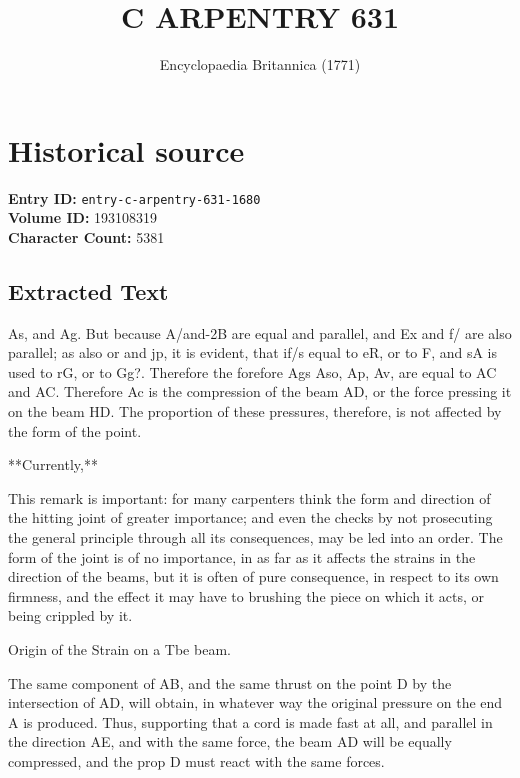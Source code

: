 \documentclass{article}
\title{C ARPENTRY 631}
\date{Encyclopaedia Britannica (1771)}
\begin{document}
\maketitle

\section*{Historical source}
\textbf{Entry ID:} \texttt{entry-c-arpentry-631-1680} \\
\textbf{Volume ID:} 193108319 \\
\textbf{Character Count:} 5381

\subsection*{Extracted Text}
As, and Ag. But because A/and-2B are equal and parallel, and Ex and f/ are also parallel; as also or and jp, it is evident, that if/s equal to eR, or to F, and sA is used to rG, or to Gg?. Therefore the forefore Ags Aso, Ap, Av, are equal to AC and AC. Therefore Ac is the compression of the beam AD, or the force pressing it on the beam HD. The proportion of these pressures, therefore, is not affected by the form of the point.

**Currently,**

This remark is important: for many carpenters think the form and direction of the hitting joint of greater importance; and even the checks by not prosecuting the general principle through all its consequences, may be led into an order. The form of the joint is of no importance, in as far as it affects the strains in the direction of the beams, but it is often of pure consequence, in respect to its own firmness, and the effect it may have to brushing the piece on which it acts, or being crippled by it.

Origin of the Strain on a Tbe beam.

The same component of AB, and the same thrust on the point D by the intersection of AD, will obtain, in whatever way the original pressure on the end A is produced. Thus, supporting that a cord is made fast at all, and parallel in the direction AE, and with the same force, the beam AD will be equally compressed, and the prop D must react with the same forces.
\end{document}
